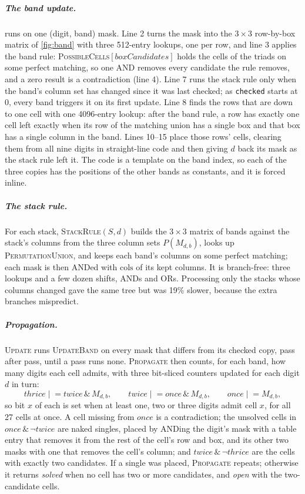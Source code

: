 \documentclass[a4paper,USenglish,cleveref,anonymous]{lipics-v2021}
\let\origtextsc\textsc
\renewcommand{\textsc}[1]{\textup{\origtextsc{#1}}}
\begin{document}
\subparagraph{The band update.}  runs on one (digit, band) mask. Line 2 turns the mask into the $3\times 3$
row-by-box matrix of \cref{fig:band} with three 512-entry lookups, one per row, and line 3 applies the band rule:
\textsc{PossibleCells}$[\mathit{boxCandidates}]$ holds the cells of the triads on some perfect matching, so one AND
removes every candidate the rule removes, and a zero result is a contradiction (line 4). Line 7 runs the stack rule only
when the band's column set has changed since it was last checked; as \texttt{checked} starts at 0, every band triggers
it on its first update. Line 8 finds the rows that are down to one cell with one 4096-entry lookup: after the band
rule, a row has exactly one cell left exactly when its row of the matching union has a single box and that box has a
single column in the band. Lines 10--15 place those rows' cells, clearing them from all nine digits in straight-line
code and then giving $d$ back its mask as the stack rule left it. The code is a template on the band index, so each of
the three copies has the positions of the other bands as constants, and it is forced inline.

\subparagraph{The stack rule.} For each stack, \textsc{StackRule}$(S,d)$ builds the $3\times 3$ matrix of bands against
the stack's columns from the three column sets $P(M_{d,b})$, looks up \textsc{PermutationUnion}, and keeps each band's
columns on some perfect matching; each mask is then ANDed with $\mathrm{cols}$ of its kept columns. It is branch-free:
three lookups and a few dozen shifts, ANDs and ORs. Processing only the stacks whose columns changed gave the same tree
but was 19\% slower, because the extra branches mispredict.

\subparagraph{Propagation.} \textsc{Update} runs \textsc{UpdateBand} on every mask that differs from its checked copy,
pass after pass, until a pass runs none. \textsc{Propagate} then counts, for each band, how many digits each cell
admits, with three bit-sliced counters updated for each digit $d$ in turn:
\[
\mathit{thrice} \mathrel{|}= \mathit{twice}\,\&\,M_{d,b}, \qquad
\mathit{twice} \mathrel{|}= \mathit{once}\,\&\,M_{d,b}, \qquad
\mathit{once} \mathrel{|}= M_{d,b},
\]
so bit $x$ of each is set when at least one, two or three digits admit cell $x$, for all 27 cells at once. A cell
missing from $\mathit{once}$ is a contradiction; the unsolved cells in $\mathit{once}\,\&\,\lnot\mathit{twice}$ are
naked singles, placed by ANDing the digit's mask with a table entry that removes it from the rest of the cell's row and
box, and its other two masks with one that removes the cell's column; and $\mathit{twice}\,\&\,\lnot\mathit{thrice}$
are the cells with exactly two candidates. If a single was placed, \textsc{Propagate} repeats; otherwise it returns
\emph{solved} when no cell has two or more candidates, and \emph{open} with the two-candidate cells.
\end{document}
